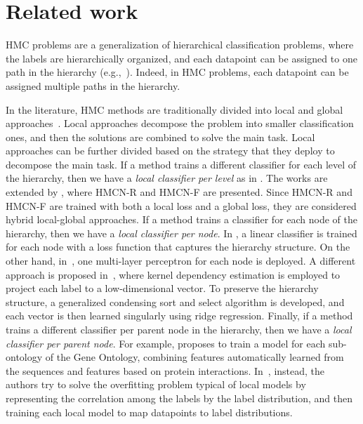 \documentclass{article}
\newcommand{\hmcnf}{{HMCN-F}}
\newcommand{\hmcnr}{{HMCN-R}}
\begin{document}
\section{Related work}
\label{sec:relwork}
HMC problems are a generalization of hierarchical classification problems, where the labels are hierarchically organized, and each datapoint can be assigned to one path in the hierarchy (e.g.,~\cite{dekel2004,ramaswamy2015,sun2001}). Indeed, in HMC problems, each datapoint can be assigned multiple paths in the hierarchy. 

In the literature, HMC methods are traditionally divided into local and global approaches~\citep{silla2011}. 
Local approaches decompose the problem into smaller classification ones, and then the solutions are combined to solve the main task. Local approaches  can be further divided based on the strategy that they deploy to decompose the main task. If a method trains a different classifier for each level of the hierarchy, then we have a {\sl local classifier per level} as in \citep{cerri2011,cerri2014,cerri2016,li2018,zou2019}. The works \citep{cerri2011,cerri2014,cerri2016} are extended by \citep{cerri2018}, where \hmcnr{} and \hmcnf{} are presented. Since  \hmcnr{} and \hmcnf{} are trained with both a local loss and a global loss, they are considered hybrid local-global approaches. If a method trains a classifier for each node of the hierarchy, then we have a {\sl local classifier per node}. In \cite{cesabianchi2006}, a linear classifier is trained for each node with a loss function that captures the hierarchy structure. On the other hand, in~\cite{feng2018}, one multi-layer perceptron for each node is deployed. A different approach is proposed in~\citep{kwok2011}, where kernel dependency estimation is employed to project each label to a low-dimensional vector. To preserve the hierarchy structure, a generalized condensing sort and select algorithm is developed, and each vector is then learned singularly using ridge regression. Finally, if a method trains a different classifier per parent node in the hierarchy, then we have a {\sl local classifier per parent node}. For example, \cite{kulmanov2018} proposes to train a model for each sub-ontology of the Gene Ontology, combining features automatically learned from the sequences and features based on protein interactions. In~\cite{xu2019aaai}, instead, the authors try to solve the overfitting problem typical of local models by representing the correlation among the labels by the label distribution, and then training each local model to map datapoints to label distributions.
\end{document}
